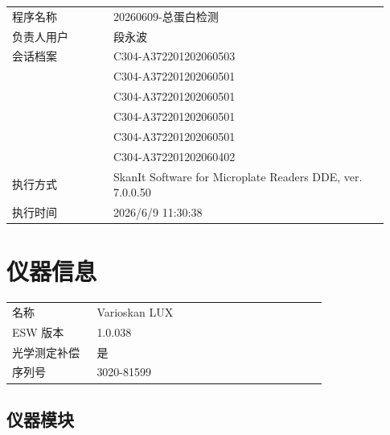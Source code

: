\documentclass[UTF8,10pt,a4paper,fontset=fandol]{ctexart}
\newcommand{\fieldvalue}[1]{#1}
\begin{document}
\begin{tabular}{@{}p{0.25\linewidth}p{0.68\linewidth}@{}}
程序名称 &
\fieldvalue{20260609-总蛋白检测}\\
负责人用户 &
\fieldvalue{段永波}\\
会话档案 &
\fieldvalue{C304-A372201202060503}\\
&
\fieldvalue{C304-A372201202060501}\\
&
\fieldvalue{C304-A372201202060501}\\
&
\fieldvalue{C304-A372201202060501}\\
&
\fieldvalue{C304-A372201202060501}\\
&
\fieldvalue{C304-A372201202060402}\\
执行方式 &
\fieldvalue{SkanIt Software for Microplate Readers DDE, ver. 7.0.0.50}\\
执行时间 &
\fieldvalue{2026/6/9 11:30:38}
\end{tabular}

\section*{仪器信息}

\begin{tabular}{@{}p{0.25\linewidth}p{0.68\linewidth}@{}}
名称 &
\fieldvalue{Varioskan LUX}\\
ESW 版本 &
\fieldvalue{1.0.038}\\
光学测定补偿 &
\fieldvalue{是}\\
序列号 &
\fieldvalue{3020-81599}
\end{tabular}

\subsection*{仪器模块}
\end{document}
